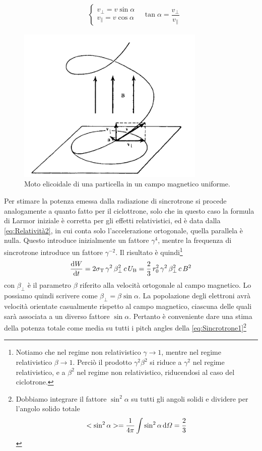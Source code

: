 \begin{align}
&\begin{cases}
v_\bot = v\sin\alpha \\
v_\|=v\cos\alpha
\end{cases}
&\tan\alpha = \dfrac{v_\bot}{v_\|}
\end{align}
\begin{figure}
\begin{center}
\includegraphics[width=0.8\textwidth]{img/Sincrotrone}
\caption{Moto elicoidale di una particella in un campo magnetico uniforme.} \label{fig:Sincrotrone}
\end{center}
\end{figure}
Per stimare la potenza emessa dalla radiazione di sincrotrone si procede analogamente a quanto fatto per il ciclottrone, solo che in questo caso la formula di Larmor iniziale è corretta per gli effetti relativistici, ed è data dalla \ref{eq:Relatività2}, in cui conta solo l'accelerazione ortogonale, quella parallela è nulla. Questo introduce inizialmente un fattore $\gamma^4$, mentre la frequenza di sincrotrone introduce un fattore $\gamma^{-2}$. Il risultato è quindi\footnote{Notiamo che nel regime non relativistico $\gamma\to 1$, mentre nel regime relativistico $\beta\to 1$. Perciò il prodotto $\gamma^2\beta^2$ si riduce a $\gamma^2$ nel regime relativistico, e a $\beta^2$ nel regime non relativistico, riducendosi al caso del ciclotrone.}
\begin{equation}
\dfrac{\mathrm{d} {W}}{\mathrm{d} {t}} = 2\sigma_\mathrm{T} \, \gamma^2 \, \beta_\bot^2 \, c \, U_\mathrm{B} = \dfrac{2}{3} \,r_0^2\,\gamma^2\,\beta_\bot^2 \,c \,B^2 \label{eq:Sincrotrone1}
\end{equation}
con $\beta_\bot $ è il parametro $\beta$ riferito alla velocità ortogonale al campo magnetico. Lo possiamo quindi scrivere come $\beta_\bot = \beta \sin\alpha$. La popolazione degli elettroni avrà velocità orientate casualmente rispetto al campo magnetico, ciascuna delle quali sarà associata a un diverso fattore $\sin\alpha$. Pertanto è conveniente dare una stima della potenza totale come media su tutti i pitch angles della \ref{eq:Sincrotrone1}\footnote{Dobbiamo integrare il fattore $\sin^2\alpha$ su tutti gli angoli solidi e dividere per l'angolo solido totale \begin{align*}
<\sin^2\alpha> = \dfrac{1}{4\pi}\int \sin^2\alpha\,\mathrm{d}\Omega = \dfrac{2}{3}
\end{align*}}
